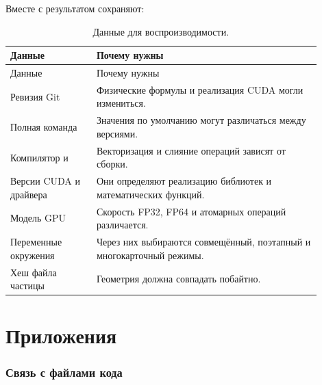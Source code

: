 \documentclass[11pt,a4paper]{article}
\newcommand{\code}[1]{\texttt{\small\detokenize{#1}}}
\begin{document}
Вместе с результатом сохраняют:
\begin{longtable}{L{0.25\linewidth} L{0.65\linewidth}}
\caption{Данные для воспроизводимости.}\\
\toprule
Данные & Почему нужны \\
\midrule
\endfirsthead
\toprule
Данные & Почему нужны \\
\midrule
\endhead
Ревизия Git & Физические формулы и реализация CUDA могли измениться. \\
Полная команда & Значения по умолчанию могут различаться между версиями. \\
Компилятор и \code{ARCH_FLAGS} & Векторизация и слияние операций зависят от сборки. \\
Версии CUDA и драйвера & Они определяют реализацию библиотек и математических функций. \\
Модель GPU & Скорость FP32, FP64 и атомарных операций различается. \\
Переменные окружения & Через них выбираются совмещённый, поэтапный и многокарточный режимы. \\
Хеш файла частицы & Геометрия должна совпадать побайтно. \\
\bottomrule
\end{longtable}

\appendix
\part{Приложения}

\section{Связь с файлами кода}
\end{document}
